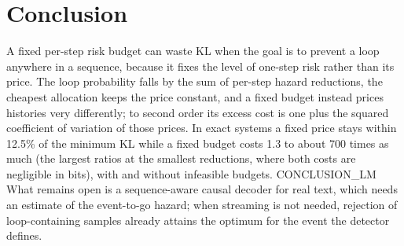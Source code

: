 \section{Conclusion}\label{sec:conclusion}
A fixed per-step risk budget can waste KL when the goal is to prevent a loop anywhere in a sequence, because it fixes the level of one-step risk rather than its price. The loop probability falls by the sum of per-step hazard reductions, the cheapest allocation keeps the price constant, and a fixed budget instead prices histories very differently; to second order its excess cost is one plus the squared coefficient of variation of those prices. In exact systems a fixed price stays within 12.5\% of the minimum KL while a fixed budget costs 1.3 to about 700 times as much (the largest ratios at the smallest reductions, where both costs are negligible in bits), with and without infeasible budgets. {{CONCLUSION_LM}} What remains open is a sequence-aware causal decoder for real text, which needs an estimate of the event-to-go hazard; when streaming is not needed, rejection of loop-containing samples already attains the optimum for the event the detector defines.
